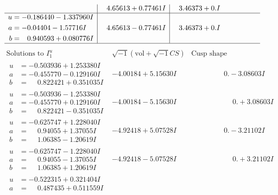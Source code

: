 \documentclass[1p]{elsarticle_modified}
\theoremstyle{definition}
\newcommand{\I}{\sqrt{-1}}
\begin{document}
$$\begin{array}{c|c|c}
 & \phantom{-}4.65613 + 0.77461 I & \phantom{-}3.46373 + 0. I\phantom{ +0.000000I} \\ \hline\begin{aligned}
u &= -0.186440 - 1.337960 I \\
a &= -0.04404 - 1.57716 I \\
b &= \phantom{-}0.940593 + 0.080776 I\end{aligned}
 & \phantom{-}4.65613 - 0.77461 I & \phantom{-}3.46373 + 0. I\phantom{ +0.000000I}\\
 \hline 
 \end{array}$$\newpage$$\begin{array}{c|c|c}  
\text{Solutions to }I^u_{1}& \I (\text{vol} + \sqrt{-1}CS) & \text{Cusp shape}\\
 \hline 
\begin{aligned}
u &= -0.503936 + 1.253380 I \\
a &= -0.455770 - 0.129160 I \\
b &= \phantom{-}0.822421 + 0.351035 I\end{aligned}
 & -4.00184 + 5.15630 I & \phantom{-0.000000 } 0. - 3.08603 I \\ \hline\begin{aligned}
u &= -0.503936 - 1.253380 I \\
a &= -0.455770 + 0.129160 I \\
b &= \phantom{-}0.822421 - 0.351035 I\end{aligned}
 & -4.00184 - 5.15630 I & \phantom{-0.000000 -}0. + 3.08603 I \\ \hline\begin{aligned}
u &= -0.625747 + 1.228040 I \\
a &= \phantom{-}0.94055 + 1.37055 I \\
b &= \phantom{-}1.06385 - 1.20619 I\end{aligned}
 & -4.92418 + 5.07528 I & \phantom{-0.000000 } 0. - 3.21102 I \\ \hline\begin{aligned}
u &= -0.625747 - 1.228040 I \\
a &= \phantom{-}0.94055 - 1.37055 I \\
b &= \phantom{-}1.06385 + 1.20619 I\end{aligned}
 & -4.92418 - 5.07528 I & \phantom{-0.000000 -}0. + 3.21102 I \\ \hline\begin{aligned}
u &= -0.522315 + 0.321404 I \\
a &= \phantom{-}0.487435 + 0.511559 I \\

\end{aligned}
\end{array}$$
\end{document}
